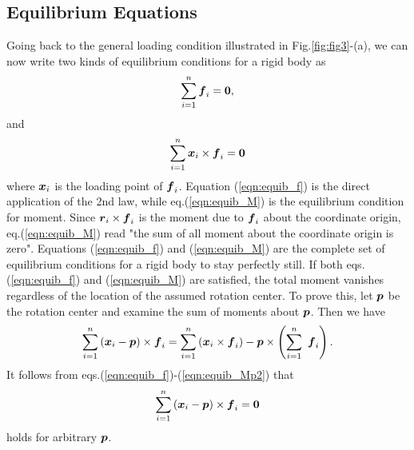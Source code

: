 \documentclass[10pt,a4j]{article}
\begin{document}
\subsection{Equilibrium Equations}
Going back to the general loading condition illustrated in Fig.\ref{fig:fig3}-(a), 
we can now write two kinds of equilibrium conditions 
for a rigid body as 
\begin{equation}
	\sum_{i=1}^n \mbox{\boldmath $f$}_i = \mbox{\boldmath $0$}, 
	\label{eqn:equib_f}
\end{equation}
and 
\begin{equation}
	\sum_{i=1}^n \mbox{\boldmath $x$}_i\times \mbox{\boldmath $f$}_i
	=
	\mbox{\boldmath $0$}
	\label{eqn:equib_M}
\end{equation}
where $\mbox{\boldmath $x$}_i$ is the loading point of $\mbox{\boldmath $f$}_i$.
Equation (\ref{eqn:equib_f}) is the direct application of the 2nd law, 
while eq.(\ref{eqn:equib_M}) is the equilibrium condition for moment.
Since $\mbox{\boldmath $r$}_i \times \mbox{\boldmath $f$}_i$ is the moment due to $\mbox{\boldmath $f$}_i$ about the 
coordinate origin, eq.(\ref{eqn:equib_M}) read "the sum of all moment about 
the coordinate origin is zero".
Equations (\ref{eqn:equib_f}) and (\ref{eqn:equib_M}) are the complete
set of equilibrium conditions for a rigid body to stay perfectly still.
If both eqs.(\ref{eqn:equib_f}) and (\ref{eqn:equib_M}) are satisfied, 
the total moment vanishes regardless of the location of the assumed 
rotation center. To prove this, let $\mbox{\boldmath $p$}$ be the rotation center and 
examine the sum of moments about  $\mbox{\boldmath $p$}$. Then we have 
\begin{equation}
	\sum_{i=1}^n \left(\mbox{\boldmath $x$}_i-\mbox{\boldmath $p$}\right) \times \mbox{\boldmath $f$}_i
	=
	\sum_{i=1}^n \left( \mbox{\boldmath $x$}_i\times \mbox{\boldmath $f$}_i  \right)
	- 
	\mbox{\boldmath $p$} \times \left(\sum_{i=1}^n \ \mbox{\boldmath $f$}_i \right). 
	\label{eqn:equib_Mp2}
\end{equation}
It follows from eqs.(\ref{eqn:equib_f})-(\ref{eqn:equib_Mp2}) that 
\begin{equation}
	\sum_{i=1}^n \left(\mbox{\boldmath $x$}_i-\mbox{\boldmath $p$}\right) \times \mbox{\boldmath $f$}_i = \mbox{\boldmath $0$}
	\label{eqn:equib_Mp}
\end{equation}
holds for arbitrary $\mbox{\boldmath $p$}$.
\end{document}
